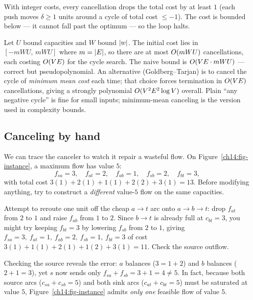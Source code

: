 With integer costs, every cancellation drops the total cost by at least $1$ (each push moves $\delta\ge 1$ units around a cycle of total cost $\le -1$). The cost is bounded below --- it cannot fall past the optimum --- so the loop halts.

\begin{complexitybox}
Let $U$ bound capacities and $W$ bound $\lvert w\rvert$. The initial cost lies in $[-mWU,\,mWU]$ where $m=\lvert E\rvert$, so there are at most $O(mWU)$ cancellations, each costing $O(VE)$ for the cycle search. The naive bound is $O(VE\cdot mWU)$ --- correct but pseudopolynomial. An alternative (Goldberg--Tarjan) is to cancel the cycle of \emph{minimum mean cost} each time; that choice forces termination in $O(VE)$ cancellations, giving a strongly polynomial $O(V^2E^2\log V)$ overall. Plain ``any negative cycle'' is fine for small inputs; minimum-mean canceling is the version used in complexity bounds.
\end{complexitybox}

\subsection{Canceling by hand}
\label{ch14:cancel-trace}

We can trace the canceler to watch it repair a wasteful flow. On Figure~\ref{ch14:fig-instance}, a maximum flow has value $5$:
\[
  f_{sa}=3,\quad f_{at}=2,\quad f_{ab}=1,\quad f_{sb}=2,\quad f_{bt}=3 ,
\]
with total cost $3(1)+2(1)+1(1)+2(2)+3(1) = 13$. Before modifying anything, try to construct a \emph{different} value-$5$ flow on the same capacities.

\begin{labbox}
Attempt to reroute one unit off the cheap $a\!\to\!t$ arc onto $a\!\to\!b\!\to\!t$: drop $f_{at}$ from $2$ to $1$ and raise $f_{ab}$ from $1$ to $2$. Since $b\!\to\!t$ is already full at $c_{bt}=3$, you might try keeping $f_{bt}=3$ by lowering $f_{sb}$ from $2$ to $1$, giving $f_{sa}=3,\ f_{at}=1,\ f_{ab}=2,\ f_{sb}=1,\ f_{bt}=3$ of cost $3(1)+1(1)+2(1)+1(2)+3(1)=11$. Check the source outflow.
\end{labbox}

Checking the source reveals the error: $a$ balances ($3 = 1+2$) and $b$ balances ($2+1 = 3$), yet $s$ now sends only $f_{sa}+f_{sb}=3+1=4\ne 5$. In fact, because both source arcs ($c_{sa}+c_{sb}=5$) and both sink arcs ($c_{at}+c_{bt}=5$) must be saturated at value $5$, Figure~\ref{ch14:fig-instance} admits \emph{only one} feasible flow of value $5$.

